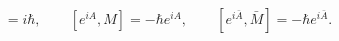 \begin{equation}
[q,p]=i\hbar, \qquad [e^{iA},M]=-\hbar e^{iA}, \qquad
[e^{i\bar{A}},\bar{M}]=-\hbar e^{i\bar{A}}.
\end{equation}

